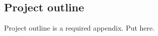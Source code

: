    \begin{uomappendix} 
        \section{Project outline}
    
            \begin{temp}
                Project outline is a required appendix. Put here.
            \end{temp}
            
            
            
            

\end{uomappendix}

